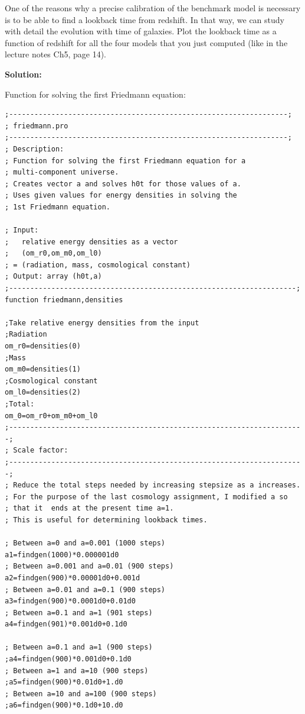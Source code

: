\documentclass[a4paper,12pt]{article}
\begin{document}
\begin{itemize}
One of the reasons why a precise calibration of the benchmark model is necessary is to be able to find a lookback time from redshift. In that way, we can study with detail the evolution with time of galaxies. Plot the lookback time as a function of redshift for all the four models that you just computed (like in the lecture notes Ch5, page 14).

\vspace{0.5cm}

\textbf{Solution:}

Function for solving the first Friedmann equation:

\begin{scriptsize}
\begin{verbatim}
;------------------------------------------------------------------;
; friedmann.pro
;------------------------------------------------------------------;
; Description:
; Function for solving the first Friedmann equation for a
; multi-component universe.
; Creates vector a and solves h0t for those values of a.
; Uses given values for energy densities in solving the 
; 1st Friedmann equation.

; Input: 
;   relative energy densities as a vector
;   (om_r0,om_m0,om_l0)
; = (radiation, mass, cosmological constant)
; Output: array (h0t,a)
;--------------------------------------------------------------------;
function friedmann,densities

;Take relative energy densities from the input
;Radiation
om_r0=densities(0)
;Mass
om_m0=densities(1)
;Cosmological constant
om_l0=densities(2)
;Total:
om_0=om_r0+om_m0+om_l0
;----------------------------------------------------------------------;
; Scale factor:
;----------------------------------------------------------------------;
; Reduce the total steps needed by increasing stepsize as a increases.
; For the purpose of the last cosmology assignment, I modified a so 
; that it  ends at the present time a=1.
; This is useful for determining lookback times.

; Between a=0 and a=0.001 (1000 steps)
a1=findgen(1000)*0.000001d0
; Between a=0.001 and a=0.01 (900 steps)
a2=findgen(900)*0.00001d0+0.001d
; Between a=0.01 and a=0.1 (900 steps)
a3=findgen(900)*0.0001d0+0.01d0
; Between a=0.1 and a=1 (901 steps)
a4=findgen(901)*0.001d0+0.1d0

; Between a=0.1 and a=1 (900 steps)
;a4=findgen(900)*0.001d0+0.1d0
; Between a=1 and a=10 (900 steps)
;a5=findgen(900)*0.01d0+1.d0
; Between a=10 and a=100 (900 steps)
;a6=findgen(900)*0.1d0+10.d0


\end{verbatim}
\end{scriptsize}
\end{itemize}
\end{document}
